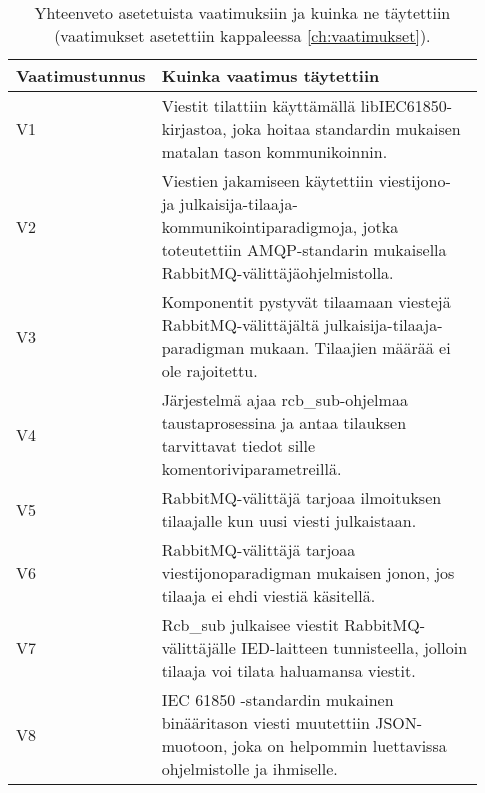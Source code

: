 \begin{table}[ht!]
	\caption{Yhteenveto asetetuista vaatimuksiin ja kuinka ne täytettiin (vaatimukset asetettiin kappaleessa \ref{ch:vaatimukset}).}
	\label{tab:requirements-met}
	\begin{tabular}{p{0.11\linewidth} | p{0.82\linewidth}}
		\hline
		\textbf{Vaatimus\-tunnus} & \textbf{Kuinka vaatimus täytettiin} \\
		\hline
		V1 & Viestit tilattiin käyttämällä libIEC61850-kirjastoa, joka hoitaa standardin mukaisen matalan tason kommunikoinnin. \\
		\hline
		V2 & Viestien jakamiseen käytettiin viestijono- ja julkaisija-tilaaja-kommunikointiparadigmoja, jotka toteutettiin AMQP-standarin mukaisella RabbitMQ-välittäjäohjelmistolla. \\
		\hline
		V3 & Komponentit pystyvät tilaamaan viestejä RabbitMQ-välittäjältä julkaisija-tilaaja-paradigman mukaan. Tilaajien määrää ei ole rajoitettu. \\
		\hline
		V4 & Järjestelmä ajaa rcb\_sub-ohjelmaa taustaprosessina ja antaa tilauksen tarvittavat tiedot sille komentoriviparametreillä. \\
		\hline
		V5 & RabbitMQ-välittäjä tarjoaa ilmoituksen tilaajalle kun uusi viesti julkaistaan. \\
		\hline
		V6 & RabbitMQ-välittäjä tarjoaa viestijonoparadigman mukaisen jonon, jos tilaaja ei ehdi viestiä käsitellä. \\
		\hline
		V7 & Rcb\_sub julkaisee viestit RabbitMQ-välittäjälle IED-laitteen tunnisteella, jolloin tilaaja voi tilata haluamansa viestit. \\
		\hline
		V8 & IEC 61850 -standardin mukainen binääritason viesti muutettiin JSON-muotoon, joka on helpommin luettavissa ohjelmistolle ja ihmiselle. \\
		\hline

\end{tabular}
\end{table}
